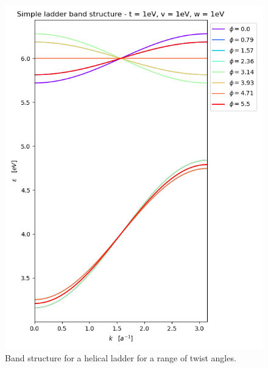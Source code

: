 \documentclass{article}
\begin{document}
\begin{figure}
    \centering
    \includegraphics[scale = 0.5]{./figures/BS-vs-p_u5t1v1w1.png}
    \caption{Band structure for a helical ladder for a range of twist angles.}
    \label{fig:helical-ladder-pi2-BS}
\end{figure}
\end{document}

